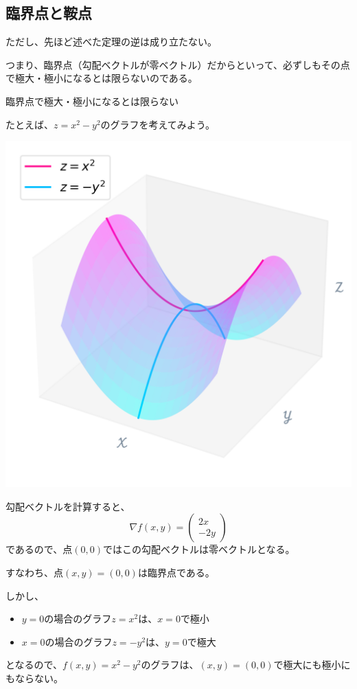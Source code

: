 \documentclass[../../../topic_calculus]{subfiles}
\begin{document}
\subsection{臨界点と鞍点}

ただし、先ほど述べた定理の逆は成り立たない。

つまり、臨界点（勾配ベクトルが零ベクトル）だからといって、必ずしもその点で極大・極小になるとは限らないのである。
\begin{emphabox}
  \begin{spacebox}
    \begin{center}
      臨界点で極大・極小になるとは限らない
    \end{center}
  \end{spacebox}
\end{emphabox}

\br

たとえば、$z = x^2 - y^2$のグラフを考えてみよう。

\br

\includegraphics{../python/graph_x-pow2-sub-y-pow2_02.png}

勾配ベクトルを計算すると、
\begin{equation*}
  \nabla f(x,y) = \begin{pmatrix} 2x \\ -2y \end{pmatrix}
\end{equation*}
であるので、点$(0,0)$ではこの勾配ベクトルは零ベクトルとなる。

すなわち、点$(x,y) = (0,0)$は臨界点である。

\br

しかし、
\begin{itemize}
  \item $y=0$の場合のグラフ$z = x^2$は、$x=0$で極小
  \item $x=0$の場合のグラフ$z = -y^2$は、$y=0$で極大
\end{itemize}
となるので、$f(x,y) = x^2 - y^2$のグラフは、$(x,y) = (0,0)$で極大にも極小にもならない。
\end{document}
